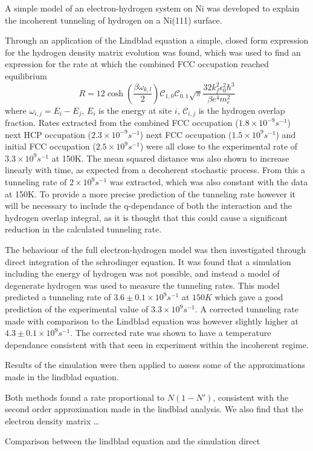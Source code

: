 A simple model of
an electron-hydrogen
system on Ni
was developed
to explain the
incoherent tunneling
of hydrogen on a
Ni(111) surface.

Through an application
of the Lindblad equation
a simple, closed form
expression for
the hydrogen density matrix
evolution was found,
which was used to
find an expression
for the rate at which
the combined
FCC occupation reached
equilibrium
\begin{equation}
    R   =
    12\cosh{(\frac{\beta \omega_{k,l}}{2})}
    \mathcal{C}_{1,0}\mathcal{C}_{0,1}
    \sqrt{\pi} \frac{32 k_f^2 \epsilon_0^2 \hbar^3}{\beta e^4 m_e^2}
\end{equation}
where \(\omega_{i,j}=E_i - E_j\),
\(E_i\) is the energy at site \(i\),
\(\mathcal{C}_{i,j}\) is the hydrogen
overlap fraction.
Rates extracted from
the combined FCC
occupation (\(1.8\times{}10^{-9}s^{-1}\))
next HCP occupation
(\(2.3\times{}10^{-9}s^{-1}\))
next FCC occupation
(\(1.5\times{}10^9s^{-1}\))
and initial FCC occupation
(\(2.5\times{}10^9s^{-1}\))
were all close to the
experimental rate
of \(3.3 \times{}10^{9}s^{-1}\)
at 150K\cite{Jianding-Zhu}.
The mean squared distance
was also shown to increase
linearly with time, as expected
from a decoherent stochastic
process. From this
a tunneling rate of
\(2 \times{}10^{9}s^{-1}\)
was extracted,
which was also constant with
the data at 150K.
To provide a more precise
prediction of the
tunneling rate however
it will be necessary
to include the q-dependance
of both the interaction
and the hydrogen overlap
integral, as it is thought
that this could cause a
significant reduction in
the calculated tunneling
rate.

The behaviour of the
full electron-hydrogen
model was then
investigated through
direct integration of
the schrodinger equation.
It was found that a
simulation
including the energy of
hydrogen was not possible,
and instead a model
of degenerate hydrogen
was used to measure the
tunneling rates.
This model predicted
a tunneling rate of
\(3.6\pm 0.1\times{}10^{9}s^{-1}\)
at \(150K\)
which gave a good
prediction of the
experimental value
of
\(3.3 \times{}10^{9}s^{-1}\)\cite{Jianding-Zhu}.
A corrected tunneling rate
made with comparison
to the Lindblad equation
was
however slightly
higher at
\(4.3\pm 0.1\times{}10^{9}s^{-1}\).
The corrected rate was shown to have
a temperature dependance
consistent with that seen in
experiment
within the incoherent regime.



Results of the simulation
were then applied
to assess some of the
approximations
made in the lindblad equation.

Both methods found a rate
proportional to \(N(1-N')\),
consistent with the second
order approximation made
in the lindblad analysis.
We also find that the electron
density matrix \ldots

Comparison between
the lindblad equation
and the simulation
direct







